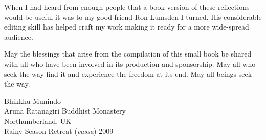 When I had heard from enough people that a book version of these
reflections would be useful it was to my good friend Ron Lumsden I
turned. His considerable editing skill has helped craft my work making
it ready for a more wide-spread audience.

May the blessings that arise from the compilation of this small book be
shared with all who have been involved in its production and
sponsorship.  May all who seek the way find it and experience the
freedom at its end. May all beings seek the way.

\bigskip

{\par\raggedleft
Bhikkhu Munindo\\
Aruna Ratanagiri Buddhist Monastery\\
Northumberland, UK\\
Rainy Season Retreat (\emph{vassa}) 2009
\par}


